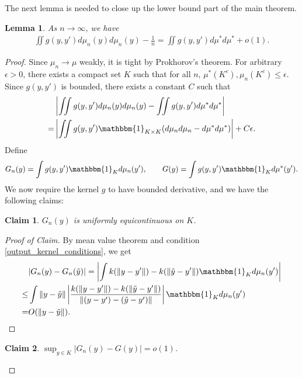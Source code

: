\documentclass[10pt]{article}
\newcommand{\norm}[1]{\left\lVert#1\right\rVert}
\newtheorem{lemma}{\bf Lemma}
\newtheorem{claim}{\bf Claim}
\newenvironment{Proof of lemma}{\noindent{\bf Proof of Lemma}}{\hfill$\Box$\newline}
\newenvironment{Proof of claim}{\noindent{\bf Proof of claim}}{\hfill$\Box$\newline}
\newenvironment{Proof of theorem}{\noindent{\bf Proof of Theorem}}{\hfill\scriptsize{$\Box$}\newline}
\newenvironment{Proof of theorems}{\noindent{\bf Proof of Theorems}}{\hfill$\Box$\newline}
\newenvironment{Proof of proposition}{\noindent{\bf Proof of Proposition}}{\hfill$\Box$\newline}
\newenvironment{Proof of propositions}{\noindent{\bf Proof of Propositions}}{\hfill$\Box$\newline}
\newenvironment{Proof of exercise}{\noindent{\it Proof of Exercise:}}{\hfill$\Box$}
\numberwithin{equation}{section}
\begin{document}
The next lemma is needed to close up the lower bound part of the main theorem.
\begin{lemma} \label{output_kernel_int_lemma}
    As $n \to \infty$, we have
    \begin{align}
        \iint g(y,y')d\mu_n(y) d\mu_n(y) - \frac{1}{n} = \iint g(y,y')d\mu^* d\mu^* + o(1).
    \end{align}
\end{lemma}
\begin{proof}
    Since $\mu_n \to \mu$ weakly, it is tight by Prokhorov's theorem. For arbitrary $\epsilon >0$, there exists a compact set $K$ such that for all $n$, $\mu^*(K^c),\mu_n(K^c) \leq \epsilon$. Since $g(y,y')$ is bounded, there exists a constant $C$ such that
    \begin{align}
          & \left|\iint g(y,y')d\mu_n(y) d\mu_n(y) - \iint g(y,y')d\mu^* d\mu^*\right| \nonumber            \\
        = & \left|\iint g(y,y') \mathbbm{1}_{K \times K}(d\mu_n d\mu_n - d\mu^* d\mu^*)\right| + C\epsilon.
    \end{align}
    Define
    \begin{align}
        G_n(y) = \int g(y,y') \mathbbm{1}_K d\mu_n(y'), \qquad G(y) = \int g(y,y') \mathbbm{1}_K d\mu^*(y').
    \end{align}
    We now require the kernel $g$ to have bounded derivative, and we have the following claims:
    \begin{claim} \label{claim_1}
        $G_n(y)$ is uniformly equicontinuous on $K$.
    \end{claim}
    \begin{proof}[Proof of Claim]
        By mean value theorem and condition \ref{output_kernel_conditions}, we get
        \begin{align}
                 & |G_n(y)-G_n(\tilde{y})| = \left|\int k(\norm{y-y'}) - k(\norm{\tilde{y}-y'}) \mathbbm{1}_K d\mu_n(y')\right| \nonumber                              \\
            \leq & \int \norm{y-\tilde{y}}\left|\frac{k(\norm{y-y'}) - k(\norm{\tilde{y}-y'})}{\norm{(y-y')-(\tilde{y}-y')}} \right|\mathbbm{1}_K d\mu_n(y') \nonumber \\
            =    & O(\norm{y-\tilde{y}}).
        \end{align}
    \end{proof}
    \begin{claim} \label{claim_2}
        $\sup_{y \in K}|G_n(y)-G(y)|=o(1)$.
    \end{claim}

\end{proof}
\end{document}
